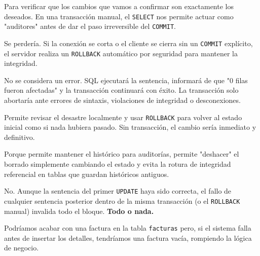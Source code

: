 \documentclass[12pt,a4paper]{article}
\begin{document}
\begin{tcolorbox}[title=Respuesta 1: Verificación Humana]
Para verificar que los cambios que vamos a confirmar son exactamente los deseados. En una transacción manual, el \texttt{SELECT} nos permite actuar como "auditores" antes de dar el paso irreversible del \texttt{COMMIT}.
\end{tcolorbox}

\begin{tcolorbox}[title=Respuesta 2: El Rollback Implícito]
Se perdería. Si la conexión se corta o el cliente se cierra sin un \texttt{COMMIT} explícito, el servidor realiza un \texttt{ROLLBACK} automático por seguridad para mantener la integridad.
\end{tcolorbox}

\begin{tcolorbox}[title=Respuesta 3: El estado de la ejecución]
No se considera un error. SQL ejecutará la sentencia, informará de que "0 filas fueron afectadas" y la transacción continuará con éxito. La transacción solo abortaría ante errores de sintaxis, violaciones de integridad o desconexiones.
\end{tcolorbox}

\begin{tcolorbox}[title=Respuesta 4: Red de seguridad]
Permite revisar el desastre localmente y usar \texttt{ROLLBACK} para volver al estado inicial como si nada hubiera pasado. Sin transacción, el cambio sería inmediato y definitivo.
\end{tcolorbox}

\begin{tcolorbox}[title=Respuesta 5: Trazabilidad]
Porque permite mantener el histórico para auditorías, permite "deshacer" el borrado simplemente cambiando el estado y evita la rotura de integridad referencial en tablas que guardan históricos antiguos.
\end{tcolorbox}

\begin{tcolorbox}[title=Respuesta 6: Atomicidad]
No. Aunque la sentencia del primer \texttt{UPDATE} haya sido correcta, el fallo de cualquier sentencia posterior dentro de la misma transacción (o el \texttt{ROLLBACK} manual) invalida todo el bloque. \textbf{Todo o nada.}
\end{tcolorbox}

\begin{tcolorbox}[title=Respuesta 7: Datos Huérfanos]
Podríamos acabar con una factura en la tabla \texttt{facturas} pero, si el sistema falla antes de insertar los detalles, tendríamos una factura vacía, rompiendo la lógica de negocio.
\end{tcolorbox}
\end{document}
